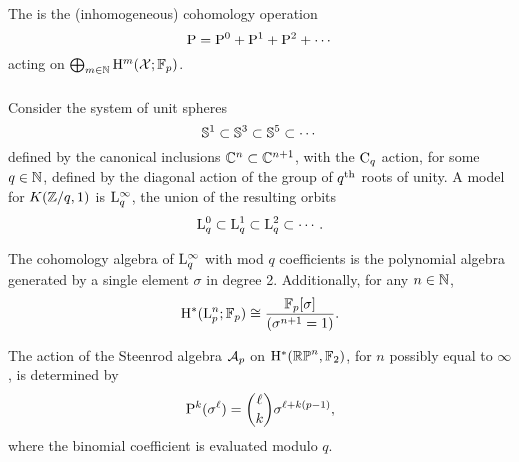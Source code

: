 The  is the (inhomogeneous) cohomology operation
\[
\mathrm{P} = \mathrm{P}^0 + \mathrm{P}^1 + \mathrm{P}^2 + \dotsb
\]
acting on \(\bigoplus_{m \in \mathbb{N}} \mathrm{H}^m(\mathcal{X}; {\mathbb{F}_p})\).

\subsubsection{}\label{sss:cohomology_lens}

Consider the system of unit spheres
\[
\mathbb{S}^1 \subset \mathbb{S}^3 \subset \mathbb{S}^5 \subset \dotsb
\]
defined by the canonical inclusions \(\mathbb{C}^n \subset \mathbb{C}^{n+1}\), with the \(\mathrm{C}_q\) action, for some \(q \in \mathbb{N}\), defined by the diagonal action of the group of \(q^{\mathrm{th}}\) roots of unity.
A model for \(K(\mathbb{Z}/q, 1)\) is \(\mathrm{L}^\infty_q\), the union of the resulting orbits
\[
\mathrm{L}^0_q \subset \mathrm{L}^1_q \subset \mathrm{L}^2_q \subset \dotsb.
\]

The cohomology algebra of $\mathrm{L}^\infty_q$ with mod \(q\) coefficients is the polynomial algebra generated by a single element $\sigma$ in degree 2.
Additionally, for any $n \in \mathbb{N}$,
\[
\mathrm{H}^\ast(\mathrm{L}^n_p; {\mathbb{F}_p}) \cong \frac{{\mathbb{F}_p}[\sigma]}{(\sigma^{n+1} = 1)}.
\]

The action of the Steenrod algebra $\mathcal{A}_p$ on $\mathrm{H}^*(\mathbb{RP}^n, {\mathbb{F}_2})$, for $n$ possibly equal to $\infty$, is determined by
\[
\mathrm{P}^k(\sigma^\ell) = \binom{\ell}{k}\sigma^{\ell+k(p-1)},
\]
where the binomial coefficient is evaluated modulo \(q\).